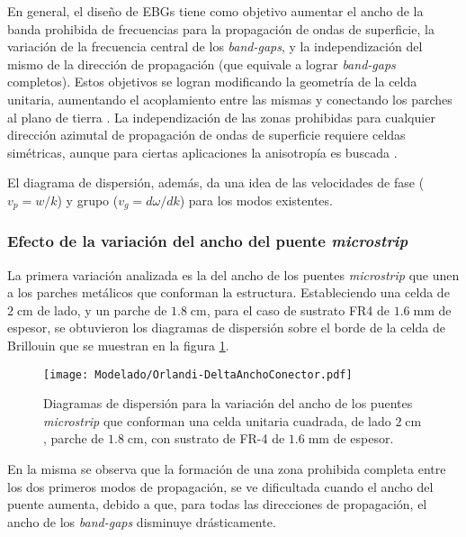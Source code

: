En general, el diseño de EBGs tiene como objetivo aumentar el ancho de la banda prohibida de frecuencias para la propagación de ondas de superficie, la variación de la frecuencia central de los \textit{band-gaps}, y la independización del mismo de la dirección de propagación (que equivale a lograr \textit{band-gaps} completos). Estos objetivos se logran modificando la geometría de la celda unitaria, aumentando el acoplamiento entre las mismas y conectando los parches al plano de tierra \cite{Marcela:Tesis}. La independización de las zonas prohibidas para cualquier dirección azimutal de propagación de ondas de superficie requiere celdas simétricas, aunque para ciertas aplicaciones la anisotropía es buscada \cite{Maci:Pole-zero-matching}.

El diagrama de dispersión, además, da una idea de las velocidades de fase ($v_p = w/k$) y grupo ($v_g = d\omega / dk$) para los modos existentes.




\subsubsection{Efecto de la variación del ancho del puente \textit{microstrip}}

La primera variación analizada es la del ancho de los puentes \textit{microstrip} que unen a los parches metálicos que conforman la estructura. Estableciendo una celda de $2\;\text{cm}$ de lado, y un parche de $1.8\;\text{cm}$, para el caso de sustrato FR4 de $1.6\;\text{mm}$ de espesor, se obtuvieron los diagramas de dispersión sobre el borde de la celda de Brillouin que se muestran en la figura \ref{fig:diagdisp-orlandi-variacion-ancho-puente}.

\begin{figure}[h]
	\centering
	\texttt{[image: Modelado/Orlandi-DeltaAnchoConector.pdf]}
	\caption{Diagramas de dispersión para la variación del ancho de los puentes \textit{microstrip} que conforman una celda unitaria cuadrada, de lado $2\;\text{cm}$, parche de $1.8\;\text{cm}$, con sustrato de FR-4 de $1.6\;\text{mm}$ de espesor.}
	\label{fig:diagdisp-orlandi-variacion-ancho-puente}
\end{figure}

En la misma se observa que la formación de una zona prohibida completa entre los dos primeros modos de propagación, se ve dificultada cuando el ancho del puente aumenta, debido a que, para todas las direcciones de propagación, el ancho de los \textit{band-gaps} disminuye drásticamente.


